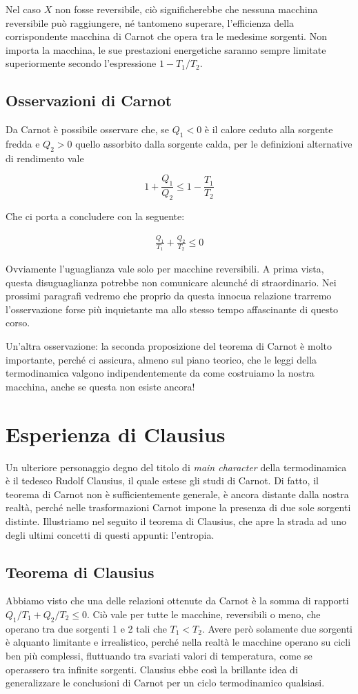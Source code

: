 Nel caso $X$ non fosse reversibile, ciò significherebbe che
nessuna macchina reversibile può raggiungere, né tantomeno
superare, l'efficienza della corrispondente macchina di Carnot
che opera tra le medesime sorgenti. Non importa la macchina,
le sue prestazioni energetiche saranno sempre limitate superiormente
secondo l'espressione $1 - T_1/T_2$.

\subsection{Osservazioni di Carnot}
Da Carnot è possibile osservare che, se $Q_1 < 0$ è il calore ceduto
alla sorgente fredda e $Q_2 > 0$ quello assorbito dalla sorgente
calda, per le definizioni alternative di rendimento vale

\[ 1 + \frac{Q_1}{Q_2} \leq 1 - \frac{T_1}{T_2} \]

\noindent Che ci porta a concludere con la seguente:

\begin{align}
    \frac{Q_1}{T_1} + \frac{Q_2}{T_2} \leq 0
\end{align}

\noindent Ovviamente l'uguaglianza vale solo per macchine reversibili.
A prima vista, questa disuguaglianza potrebbe non comunicare
alcunché di straordinario. Nei prossimi paragrafi vedremo che
proprio da questa innocua relazione trarremo l'osservazione
forse più inquietante ma allo stesso tempo affascinante di
questo corso.

Un'altra osservazione: la seconda proposizione del teorema di Carnot
è molto importante, perché ci assicura, almeno sul piano teorico, che
le leggi della termodinamica valgono indipendentemente da come costruiamo
la nostra macchina, anche se questa non esiste ancora!

\section{Esperienza di Clausius}
Un ulteriore personaggio degno del titolo di \textit{main character}
della termodinamica è il tedesco Rudolf Clausius, il quale estese
gli studi di Carnot. Di fatto, il teorema di Carnot non è sufficientemente
generale, è ancora distante dalla nostra realtà, perché nelle trasformazioni
Carnot impone la presenza di due sole sorgenti distinte. Illustriamo nel seguito
il teorema di Clausius, che apre la strada ad uno degli ultimi concetti di questi
appunti: l'entropia.

\subsection{Teorema di Clausius}
Abbiamo visto che una delle relazioni ottenute da Carnot è la
somma di rapporti $Q_1/T_1 + Q_2/T_2 \leq 0$. Ciò vale per tutte
le macchine, reversibili o meno, che operano tra due sorgenti 1
e 2 tali che $T_1 < T_2$. Avere però solamente due sorgenti è
alquanto limitante e irrealistico, perché nella realtà le macchine
operano su cicli ben più complessi, fluttuando tra svariati valori
di temperatura, come se operassero tra infinite sorgenti. Clausius
ebbe così la brillante idea di generalizzare le conclusioni di
Carnot per un ciclo termodinamico qualsiasi.

